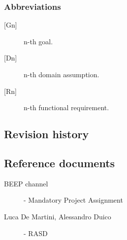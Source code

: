 \subsubsection{Abbreviations}

\begin{description}
    \item [{[Gn]}] n-th goal.
    \item [{[Dn]}] n-th domain assumption.
    \item [{[Rn]}] n-th functional requirement.
\end{description}

\subsection{Revision history}

\subsection{Reference documents}

\begin{description}
    \item [BEEP channel] - Mandatory Project Assignment
    \item [Luca De Martini, Alessandro Duico] - RASD
\end{description}


